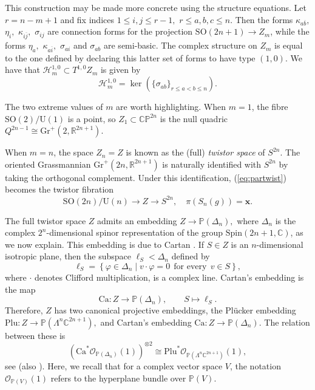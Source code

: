 \documentclass[11pt]{article}
\theoremstyle{definition}
\newcommand{\R}{\mathbb{R}}
\newcommand{\C}{\mathbb{C}}
\newcommand{\SO}{\mathrm{SO}}
\newcommand{\U}{\mathrm{U}}
\numberwithin{equation}{section}
\begin{document}
This construction may be made more concrete using the structure equations. Let $r=n-m+1$ and fix indices $1 \leq i,j \leq r-1,$ $r \leq a, b, c \leq n.$ Then the forms $\kappa_{a \overline{b}},$ $\eta_i,$ $\kappa_{i \overline{j}},$ $\sigma_{ij}$ are connection forms for the projection $\SO(2n+1) \to Z_m$, while the forms $\eta_a,$ $\kappa_{a \overline{i}},$ $\sigma_{ai}$ and $\sigma_{ab}$ are semi-basic. The complex structure on $Z_m$ is equal to the one defined by declaring this latter set of forms to have type $(1,0)$. We have that $\mathcal{H}^{1,0}_m \subset T^{1,0} Z_m$ is given by
\begin{equation*}
	\mathcal{H}^{1,0}_m = \ker(\lbrace \sigma_{ab} \rbrace_{r \leq a < b \leq n}).
\end{equation*}
    
The two extreme values of $m$ are worth highlighting. When $m=1$, the fibre $\SO(2)/\U(1)$ is a point, so $Z_1 \subset \mathbb{CP}^{2n}$ is the null quadric $Q^{2n-1} \cong \mathrm{Gr}^+(2,\R^{2n+1})$.

When $m=n$, the space $Z_n = Z$ is known as the (full) \emph{twistor space} of $S^{2n}.$ The oriented Grassmannian $\mathrm{Gr}^+(2n,\R^{2n+1})$ is naturally identified with $S^{2n}$ by taking the orthogonal complement. Under this identification, (\ref{eq:partwist}) becomes the twistor fibration
\begin{equation*}
	\SO(2n)/\U(n) \to Z \to S^{2n}, \quad \pi(S_n(g)) = \mathbf{x}.
\end{equation*}


The full twistor space $Z$ admits an embedding $Z \to \mathbb{P}(\Delta_n),$ where $\Delta_n$ is the complex $2^n$-dimensional spinor representation of the group $\mathrm{Spin}(2n+1,\C)$, as we now explain. This embedding is due to Cartan \cite{Cartan81}. If $S \in Z$ is an $n$-dimensional isotropic plane, then the subspace $\ell_S < \Delta_n$ defined by
\begin{equation*}
    \ell_S = \left\lbrace \varphi\in\Delta_n \mid v \cdot \varphi = 0 \:\: \text{for every} \:\: v\in S \right\rbrace,
\end{equation*}
where $\cdot$ denotes Clifford multiplication, is a complex line. Cartan's embedding is the map
\begin{equation*}
    \mathrm{Ca} : Z \to \mathbb{P}(\Delta_n), \qquad S \mapsto \ell_S.
\end{equation*}
Therefore, $Z$ has two canonical projective embeddings, the Pl\"ucker embedding $\mathrm{Plu}: Z \to \mathbb{P}(\Lambda^n \C^{2n+1}),$ and Cartan's embedding $\mathrm{Ca} : Z \to \mathbb{P}(\Delta_n).$ The relation between these is
\begin{equation}\label{eq:spinorsquarerel}
    (\mathrm{Ca}^*\mathcal{O}_{\mathbb{P}(\Delta_n)}(1))^{\otimes 2} \cong \mathrm{Plu}^* \mathcal{O}_{\mathbb{P}(\Lambda^n \C^{2n+1})}(1),
\end{equation}
see \cite[\S109]{Cartan81} (also \cite{Hano96}). Here, we recall that for a complex vector space $V$, the notation $\mathcal{O}_{\mathbb{P}(V)}(1)$ refers to the hyperplane bundle over $\mathbb{P}(V)$.
    
\end{document}
